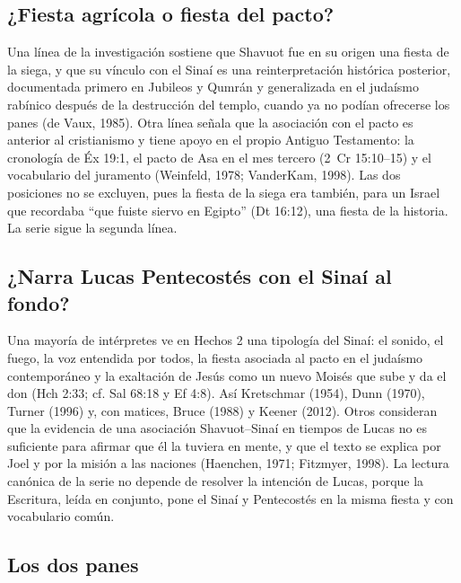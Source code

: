 \documentclass[11pt,letterpaper]{article}
\begin{document}
\subsection{¿Fiesta agrícola o fiesta del pacto?}

Una línea de la investigación sostiene que Shavuot fue en su origen una fiesta de la siega, y que su vínculo con el Sinaí es una reinterpretación histórica posterior, documentada primero en Jubileos y Qumrán y generalizada en el judaísmo rabínico después de la destrucción del templo, cuando ya no podían ofrecerse los panes (de Vaux, 1985). Otra línea señala que la asociación con el pacto es anterior al cristianismo y tiene apoyo en el propio Antiguo Testamento: la cronología de Éx 19:1, el pacto de Asa en el mes tercero (2~Cr 15:10--15) y el vocabulario del juramento (Weinfeld, 1978; VanderKam, 1998). Las dos posiciones no se excluyen, pues la fiesta de la siega era también, para un Israel que recordaba ``que fuiste siervo en Egipto'' (Dt 16:12), una fiesta de la historia. La serie sigue la segunda línea.

\subsection{¿Narra Lucas Pentecostés con el Sinaí al fondo?}

Una mayoría de intérpretes ve en Hechos 2 una tipología del Sinaí: el sonido, el fuego, la voz entendida por todos, la fiesta asociada al pacto en el judaísmo contemporáneo y la exaltación de Jesús como un nuevo Moisés que sube y da el don (Hch 2:33; cf. Sal 68:18 y Ef 4:8). Así Kretschmar (1954), Dunn (1970), Turner (1996) y, con matices, Bruce (1988) y Keener (2012). Otros consideran que la evidencia de una asociación Shavuot--Sinaí en tiempos de Lucas no es suficiente para afirmar que él la tuviera en mente, y que el texto se explica por Joel y por la misión a las naciones (Haenchen, 1971; Fitzmyer, 1998). La lectura canónica de la serie no depende de resolver la intención de Lucas, porque la Escritura, leída en conjunto, pone el Sinaí y Pentecostés en la misma fiesta y con vocabulario común.

\subsection{Los dos panes}
\end{document}
